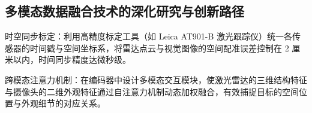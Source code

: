 \subsection{多模态数据融合技术的深化研究与创新路径}


时空同步标定：利用高精度标定工具（如 Leica AT901-B 激光跟踪仪）统一各传感器的时间戳与空间坐标系，将雷达点云与视觉图像的空间配准误差控制在 2 厘米以内，时间同步精度达微秒级\cite{tsinghua2022calibration}。

跨模态注意力机制：在编码器中设计多模态交互模块，使激光雷达的三维结构特征与摄像头的二维外观特征通过自注意力机制动态加权融合，有效捕捉目标的空间位置与外观细节的对应关系\cite{peterson2021transformer}。









